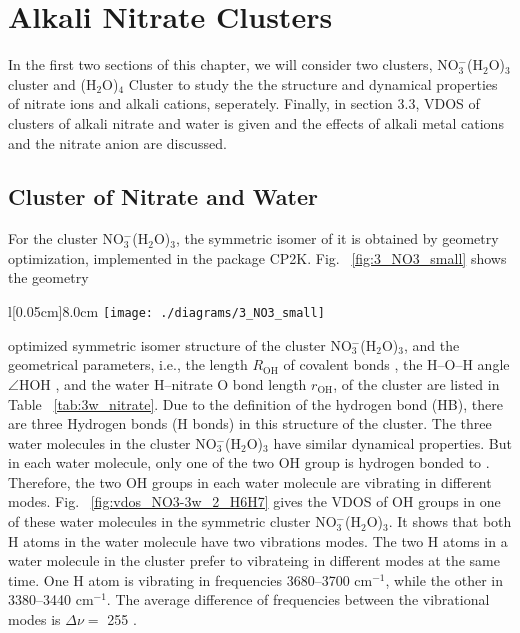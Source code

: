 \chapter{Alkali Nitrate Clusters}\label{CHAPTER_results_clusters}
In the first two sections of this chapter, we will consider two clusters, NO$_3^-$(H$_2$O)$_3$ cluster and \li(H$_2$O)$_4$ Cluster to study the the structure and dynamical properties of nitrate ions and alkali cations, seperately. Finally, in section 3.3, VDOS of clusters of alkali nitrate and water is given and the effects of alkali metal cations and the nitrate anion are discussed. 

\section{Cluster of Nitrate and Water}\label{section_3w_nitrate}
For the cluster NO$_3^-$(H$_2$O)$_3$, the symmetric isomer of  it is obtained by geometry optimization, implemented in the package CP2K. Fig. ~\ref{fig:3_NO3_small} shows the geometry 
\begin{wrapfigure}{l}[0.05cm]{8.0cm}
\centering
\texttt{[image: ./diagrams/3\_NO3\_small]}
\setlength{\abovecaptionskip}{10pt}
\caption{The stable geometry optimized structure of the cluster NO$_3^-$(H$_2$O)$_3$. The red dotted lines denote the H-bonds.}\label{fig:3_NO3_small}
\end{wrapfigure}
optimized symmetric isomer structure of the cluster NO$_3^-$(H$_2$O)$_3$, and the geometrical 
parameters, i.e., the length $R_\text{OH}$ of covalent bonds , the H--O--H angle $\angle$HOH , and the water H--nitrate O bond length $r_\text{OH}$, of the cluster are listed in Table ~\ref{tab:3w_nitrate}. 
Due to the definition of the hydrogen bond (HB)\cite{JT90,SB02}, there are three Hydrogen bonds (H bonds) in this structure of the cluster. 
The three water molecules in the cluster NO$_3^-$(H$_2$O)$_3$ have similar dynamical properties. But in each water molecule, only one of the two OH group is hydrogen bonded to \nitrate. 
Therefore, the two OH groups in each water molecule are vibrating in different modes. Fig. ~\ref{fig:vdos_NO3-3w_2_H6H7} gives the VDOS of OH groups in one of these water molecules in the symmetric cluster NO$_3^-$(H$_2$O)$_3$.
It shows that both H atoms in the water molecule have two vibrations modes. 
The two H atoms in a water molecule in the cluster prefer to vibrateing in different modes at the same time. One H atom is vibrating in frequencies 3680--3700 cm$^{-1}$, while the other in 3380--3440 cm$^{-1}$. The average difference of frequencies between the vibrational modes is $\Delta\nu=$ 255 \centmeter. 
